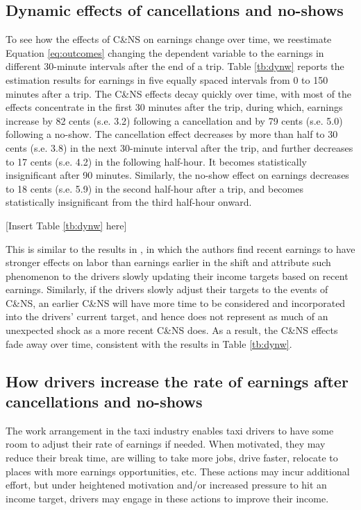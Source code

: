 \documentclass[reviewmode,AEJ]{AEA}
\begin{document}
\subsection{Dynamic effects of cancellations and no-shows}
To see how the effects of C\&NS on earnings change over time, we reestimate Equation \eqref{eq:outcomes} changing the dependent variable to the earnings in different 30-minute intervals after the end of a trip. Table \ref{tb:dynw} reports the estimation results for earnings in five equally spaced intervals from 0 to 150 minutes after a trip. The C\&NS effects decay quickly over time, with most of the effects concentrate in the first 30 minutes after the trip, during which, earnings increase by 82 cents (s.e. 3.2) following a cancellation and by 79 cents (s.e. 5.0) following a no-show. The cancellation effect decreases by more than half to 30 cents (s.e. 3.8) in the next 30-minute interval after the trip, and further decreases to 17 cents (s.e. 4.2) in the following half-hour. It becomes statistically insignificant after 90 minutes. Similarly, the no-show effect on earnings decreases to 18 cents (s.e. 5.9) in the second half-hour after a trip, and becomes statistically insignificant from the third half-hour onward.


\begin{center}
	[Insert Table \ref{tb:dynw} here]
\end{center}


This is similar to the results in \citet{thakral2018daily}, in which the authors find recent
earnings to have stronger effects on labor than earnings earlier in the shift 
and attribute such phenomenon to the drivers slowly updating their income targets based on recent earnings.
Similarly, if the drivers slowly adjust their targets to the events of C\&NS, an earlier C\&NS will have
more time to be considered and incorporated into the drivers' current target, and hence does not represent
as much of an unexpected shock as a more recent C\&NS does. As a result, the C\&NS effects fade away over
time, consistent with the results in Table \ref{tb:dynw}.


\subsection{How drivers increase the rate of earnings after cancellations and no-shows}
The work arrangement in the taxi industry enables taxi drivers to have some room to adjust their rate of earnings if needed. When motivated, they may reduce their break time, are willing to take more jobs, drive faster, relocate to places with more earnings opportunities, etc. These actions may incur additional effort, but under heightened motivation and/or increased pressure to hit an income target, drivers may engage 
in these actions to improve their income.
\end{document}
